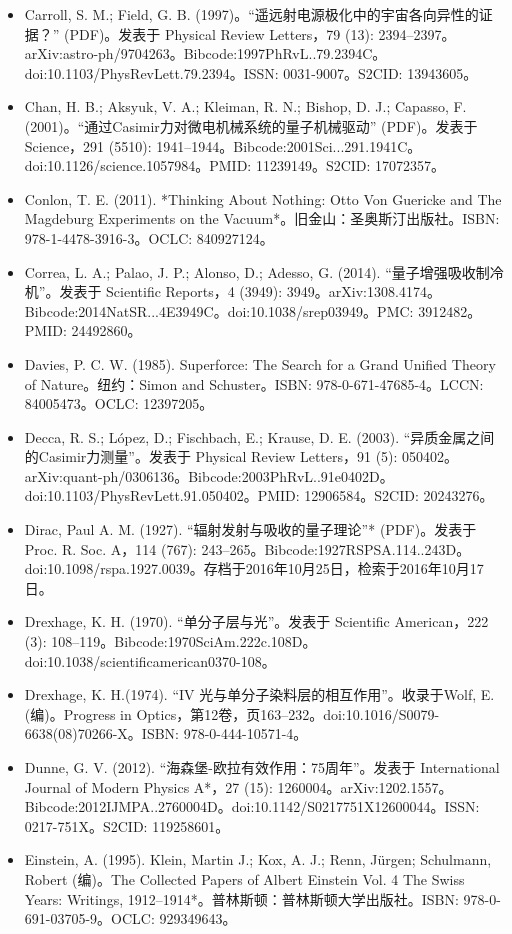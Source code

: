 \begin{itemize}
\item Carroll, S. M.; Field, G. B. (1997)。“遥远射电源极化中的宇宙各向异性的证据？” (PDF)。发表于 Physical Review Letters，79 (13): 2394–2397。arXiv:astro-ph/9704263。Bibcode:1997PhRvL..79.2394C。doi:10.1103/PhysRevLett.79.2394。ISSN: 0031-9007。S2CID: 13943605。
\item Chan, H. B.; Aksyuk, V. A.; Kleiman, R. N.; Bishop, D. J.; Capasso, F. (2001)。“通过Casimir力对微电机械系统的量子机械驱动” (PDF)。发表于 Science，291 (5510): 1941–1944。Bibcode:2001Sci...291.1941C。doi:10.1126/science.1057984。PMID: 11239149。S2CID: 17072357。
\item Conlon, T. E. (2011). *Thinking About Nothing: Otto Von Guericke and The Magdeburg Experiments on the Vacuum*。旧金山：圣奥斯汀出版社。ISBN: 978-1-4478-3916-3。OCLC: 840927124。
\item Correa, L. A.; Palao, J. P.; Alonso, D.; Adesso, G. (2014). “量子增强吸收制冷机”。发表于 Scientific Reports，4 (3949): 3949。arXiv:1308.4174。Bibcode:2014NatSR...4E3949C。doi:10.1038/srep03949。PMC: 3912482。PMID: 24492860。
\item Davies, P. C. W. (1985). Superforce: The Search for a Grand Unified Theory of Nature。纽约：Simon and Schuster。ISBN: 978-0-671-47685-4。LCCN: 84005473。OCLC: 12397205。
\item Decca, R. S.; López, D.; Fischbach, E.; Krause, D. E. (2003). “异质金属之间的Casimir力测量”。发表于 Physical Review Letters，91 (5): 050402。arXiv:quant-ph/0306136。Bibcode:2003PhRvL..91e0402D。doi:10.1103/PhysRevLett.91.050402。PMID: 12906584。S2CID: 20243276。
\item Dirac, Paul A. M. (1927). “辐射发射与吸收的量子理论”* (PDF)。发表于 Proc. R. Soc. A，114 (767): 243–265。Bibcode:1927RSPSA.114..243D。doi:10.1098/rspa.1927.0039。存档于2016年10月25日，检索于2016年10月17日。
\item Drexhage, K. H. (1970). “单分子层与光”。发表于 Scientific American，222 (3): 108–119。Bibcode:1970SciAm.222c.108D。doi:10.1038/scientificamerican0370-108。
\item Drexhage, K. H.(1974). “IV 光与单分子染料层的相互作用”。收录于Wolf, E. (编)。Progress in Optics，第12卷，页163–232。doi:10.1016/S0079-6638(08)70266-X。ISBN: 978-0-444-10571-4。
\item Dunne, G. V. (2012). “海森堡-欧拉有效作用：75周年”。发表于 International Journal of Modern Physics A*，27 (15): 1260004。arXiv:1202.1557。Bibcode:2012IJMPA..2760004D。doi:10.1142/S0217751X12600044。ISSN: 0217-751X。S2CID: 119258601。
\item Einstein, A. (1995). Klein, Martin J.; Kox, A. J.; Renn, Jürgen; Schulmann, Robert (编)。The Collected Papers of Albert Einstein Vol. 4 The Swiss Years: Writings, 1912–1914*。普林斯顿：普林斯顿大学出版社。ISBN: 978-0-691-03705-9。OCLC: 929349643。

\end{itemize}
